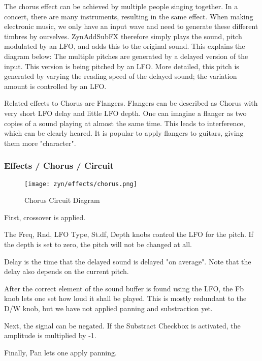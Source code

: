    The chorus effect can be achieved by multiple people singing together. In
   a concert, there are many instruments, resulting in the same effect. When
   making electronic music, we only have an input wave and need to generate
   these different timbres by ourselves. ZynAddSubFX therefore simply plays
   the sound, pitch modulated by an LFO, and adds this to the original sound.
   This explains the diagram below: The multiple pitches are generated by a
   delayed version of the input. This version is being pitched by an LFO.
   More detailed, this pitch is generated by varying the reading speed of
   the delayed sound; the variation amount is controlled by an LFO.

   Related effects to Chorus are Flangers. Flangers can be described as
   Chorus with very short LFO delay and little LFO depth. One can imagine a
   flanger as two copies of a sound playing at almost the same time. This
   leads to interference, which can be clearly heared. It is popular to apply
   flangers to guitars, giving them more "character".

\subsubsection{Effects / Chorus / Circuit}
\label{subsubsec:effects_edit_chorus_circuit}

\begin{figure}[H]
   \centering 
   \texttt{[image: zyn/effects/chorus.png]}
   \caption{Chorus Circuit Diagram}
   \label{fig:chorus_circuit_diagram}
\end{figure}

   First, crossover is applied.

   The Freq, Rnd, LFO Type, St.df, Depth knobs control the LFO
   for the pitch. If the depth is set to zero, the pitch will not be changed
   at all.

   Delay is the time that the delayed sound is delayed "on average". Note
   that the delay also depends on the current pitch.

   After the correct element of the sound buffer is found using the LFO, the
   Fb knob lets one set how loud it shall be played. This is mostly redundant
   to the D/W knob, but we have not applied panning and substraction yet.

   Next, the signal can be negated. If the Substract Checkbox is activated,
   the amplitude is multiplied by -1.

   Finally, Pan lets one apply panning.

